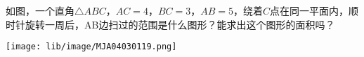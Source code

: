 如图，一个直角$\triangle$$ABC$，$AC = 4$，$BC = 3$，$AB = 5$，绕着$C$点在同一平面内，顺时针旋转一周后，AB边扫过的范围是什么图形？能求出这个图形的面积吗？

\begin{center}
    \texttt{[image: lib/image/MJA04030119.png]}
\end{center}
